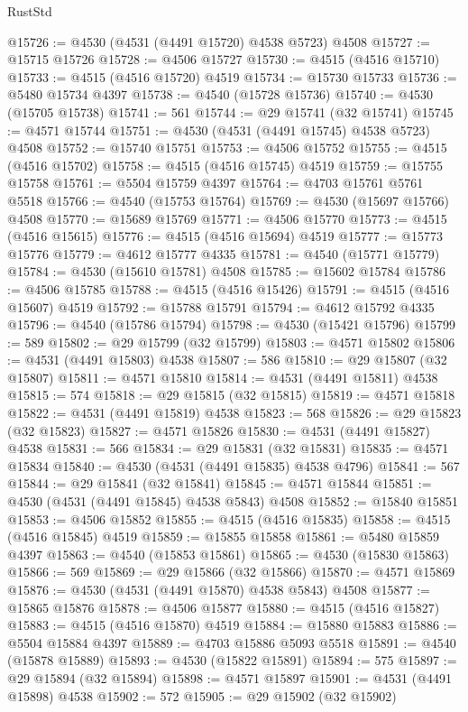 \begin{lexlean}{RustStd}
\begin{coremodule}
@15726 := @4530 (@4531 (@4491 @15720) @4538 @5723) @4508
@15727 := @15715 @15726
@15728 := @4506 @15727
@15730 := @4515 (@4516 @15710)
@15733 := @4515 (@4516 @15720) @4519
@15734 := @15730 @15733
@15736 := @5480 @15734 @4397
@15738 := @4540 (@15728 @15736)
@15740 := @4530 (@15705 @15738)
@15741 := 561
@15744 := @29 @15741 (@32 @15741)
@15745 := @4571 @15744
@15751 := @4530 (@4531 (@4491 @15745) @4538 @5723) @4508
@15752 := @15740 @15751
@15753 := @4506 @15752
@15755 := @4515 (@4516 @15702)
@15758 := @4515 (@4516 @15745) @4519
@15759 := @15755 @15758
@15761 := @5504 @15759 @4397
@15764 := @4703 @15761 @5761 @5518
@15766 := @4540 (@15753 @15764)
@15769 := @4530 (@15697 @15766) @4508
@15770 := @15689 @15769
@15771 := @4506 @15770
@15773 := @4515 (@4516 @15615)
@15776 := @4515 (@4516 @15694) @4519
@15777 := @15773 @15776
@15779 := @4612 @15777 @4335
@15781 := @4540 (@15771 @15779)
@15784 := @4530 (@15610 @15781) @4508
@15785 := @15602 @15784
@15786 := @4506 @15785
@15788 := @4515 (@4516 @15426)
@15791 := @4515 (@4516 @15607) @4519
@15792 := @15788 @15791
@15794 := @4612 @15792 @4335
@15796 := @4540 (@15786 @15794)
@15798 := @4530 (@15421 @15796)
@15799 := 589
@15802 := @29 @15799 (@32 @15799)
@15803 := @4571 @15802
@15806 := @4531 (@4491 @15803) @4538
@15807 := 586
@15810 := @29 @15807 (@32 @15807)
@15811 := @4571 @15810
@15814 := @4531 (@4491 @15811) @4538
@15815 := 574
@15818 := @29 @15815 (@32 @15815)
@15819 := @4571 @15818
@15822 := @4531 (@4491 @15819) @4538
@15823 := 568
@15826 := @29 @15823 (@32 @15823)
@15827 := @4571 @15826
@15830 := @4531 (@4491 @15827) @4538
@15831 := 566
@15834 := @29 @15831 (@32 @15831)
@15835 := @4571 @15834
@15840 := @4530 (@4531 (@4491 @15835) @4538 @4796)
@15841 := 567
@15844 := @29 @15841 (@32 @15841)
@15845 := @4571 @15844
@15851 := @4530 (@4531 (@4491 @15845) @4538 @5843) @4508
@15852 := @15840 @15851
@15853 := @4506 @15852
@15855 := @4515 (@4516 @15835)
@15858 := @4515 (@4516 @15845) @4519
@15859 := @15855 @15858
@15861 := @5480 @15859 @4397
@15863 := @4540 (@15853 @15861)
@15865 := @4530 (@15830 @15863)
@15866 := 569
@15869 := @29 @15866 (@32 @15866)
@15870 := @4571 @15869
@15876 := @4530 (@4531 (@4491 @15870) @4538 @5843) @4508
@15877 := @15865 @15876
@15878 := @4506 @15877
@15880 := @4515 (@4516 @15827)
@15883 := @4515 (@4516 @15870) @4519
@15884 := @15880 @15883
@15886 := @5504 @15884 @4397
@15889 := @4703 @15886 @5093 @5518
@15891 := @4540 (@15878 @15889)
@15893 := @4530 (@15822 @15891)
@15894 := 575
@15897 := @29 @15894 (@32 @15894)
@15898 := @4571 @15897
@15901 := @4531 (@4491 @15898) @4538
@15902 := 572
@15905 := @29 @15902 (@32 @15902)

\end{coremodule}
\end{lexlean}
